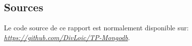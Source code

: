 \subsection*{Sources}
Le code source de ce rapport est normalement disponible sur: \textit{ \href{https://github.com/DivLoic/TP-Mongodb}{https://github.com/DivLoic/TP-Mongodb}}.